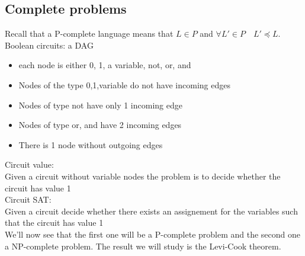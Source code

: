 \subsection*{Complete problems}
Recall that a P-complete language means that $L \in P$ and $\forall L' \in P \quad L' \preceq L$. Boolean circuits: a DAG 
\begin{itemize}
    \item each node is either 0, 1, a variable, not, or, and
    \item Nodes of the type 0,1,variable do not have incoming edges
    \item Nodes of type not have only 1 incoming edge
    \item Nodes of type or, and have 2 incoming edges
    \item There is 1 node without outgoing edges
\end{itemize}
Circuit value:\\
Given a circuit without variable nodes the problem is to decide whether the circuit has value 1\\
Circuit SAT: \\
Given a circuit decide whether there exists an assignement for the variables such that the circuit has value 1\\
We'll now see that the first one will be a P-complete problem and the second one a NP-complete problem. The result we will study is the Levi-Cook theorem.
